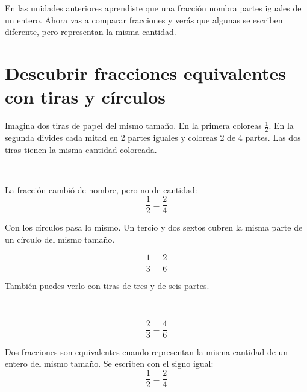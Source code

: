 
En las unidades anteriores aprendiste que una fracción nombra partes iguales de un entero. Ahora vas a comparar fracciones y verás que algunas se escriben diferente, pero representan la misma cantidad.

\section{Descubrir fracciones equivalentes con tiras y círculos}

Imagina dos tiras de papel del mismo tamaño. En la primera coloreas $\frac{1}{2}$. En la segunda divides cada mitad en 2 partes iguales y coloreas 2 de 4 partes. Las dos tiras tienen la misma cantidad coloreada.

\begin{center}
\\[2pt]
\end{center}

La fracción cambió de nombre, pero no de cantidad:
\[
\frac{1}{2}=\frac{2}{4}
\]

Con los círculos pasa lo mismo. Un tercio y dos sextos cubren la misma parte de un círculo del mismo tamaño.

\begin{center}
\hspace{1cm}
\end{center}

\[
\frac{1}{3}=\frac{2}{6}
\]

También puedes verlo con tiras de tres y de seis partes.

\begin{center}
\\[2pt]
\end{center}

\[
\frac{2}{3}=\frac{4}{6}
\]

\begin{wbidea}
Dos fracciones son equivalentes cuando representan la misma cantidad de un entero del mismo tamaño. Se escriben con el signo igual:
\[
\frac{1}{2}=\frac{2}{4}
\]
\end{wbidea}

